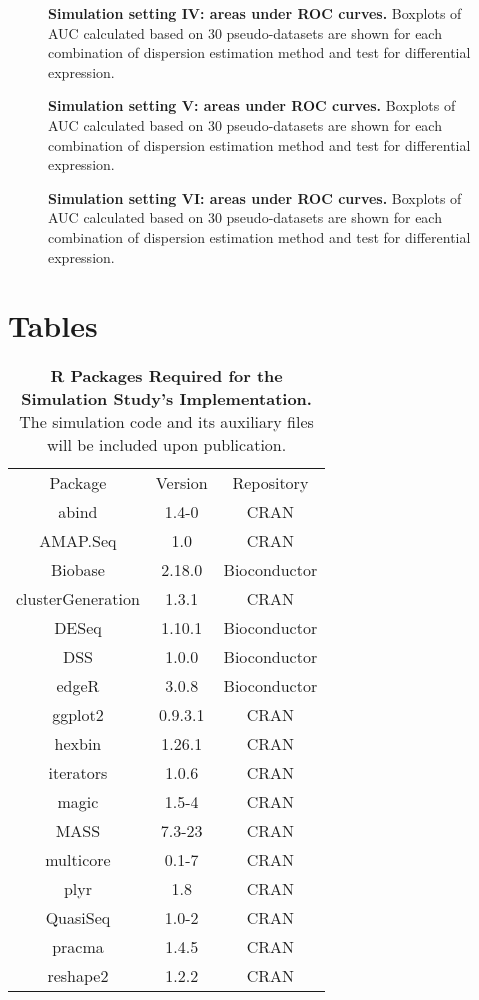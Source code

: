 \documentclass[10pt]{article}
\begin{document}
\begin{figure}[!ht] %
   \centering
   \caption{{\bf Simulation setting IV: areas under ROC curves.} Boxplots of AUC calculated based on 30 pseudo-datasets are shown for each combination of dispersion estimation method and test for differential expression.} \label{fig:auc4}
\end{figure}

\begin{figure}[!ht] %
   \centering
   \caption{{\bf Simulation setting V: areas under ROC curves.} Boxplots of AUC calculated based on 30 pseudo-datasets are shown for each combination of dispersion estimation method and test for differential expression.} \label{fig:auc5}
\end{figure}

\begin{figure}[!ht] %
   \centering
   \caption{{\bf Simulation setting VI: areas under ROC curves.} Boxplots of AUC calculated based on 30 pseudo-datasets are shown for each combination of dispersion estimation method and test for differential expression.} \label{fig:auc6}
\end{figure}


\clearpage

\section*{Tables}

\begin{table}[!ht] %
   \centering
   \caption{{\bf R Packages Required for the Simulation Study's Implementation.} The simulation code and its auxiliary files will be included upon publication.}
\begin{tabular}{|c|c|c|}
Package & Version & Repository \\
  abind & 1.4-0 &CRAN\\
  AMAP.Seq & 1.0 &CRAN\\
  Biobase & 2.18.0 &Bioconductor\\
  clusterGeneration & 1.3.1 &CRAN\\
  DESeq & 1.10.1 &Bioconductor\\
  DSS & 1.0.0 &Bioconductor\\
  edgeR & 3.0.8 &Bioconductor\\
  ggplot2 & 0.9.3.1 &CRAN\\
  hexbin & 1.26.1 &CRAN\\
  iterators & 1.0.6 &CRAN\\
  magic & 1.5-4 &CRAN\\
  MASS & 7.3-23 &CRAN\\
  multicore & 0.1-7 &CRAN\\
  plyr & 1.8 &CRAN\\
  QuasiSeq & 1.0-2 &CRAN\\
  pracma & 1.4.5 &CRAN\\
  reshape2 & 1.2.2 &CRAN\\
\end{tabular}
\label{tab:software}
\end{table}
\end{document}
